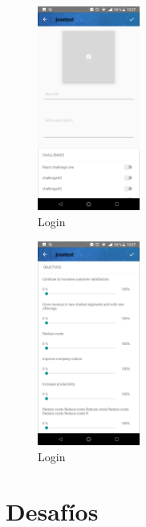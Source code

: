 \begin{figure}[!h]
	\begin{center}
		\includegraphics[width=0.3\textwidth]{./img/anexo1/crear_idea.png}
		\caption{Login}
		\label{fig:crear_idea}
	\end{center}
\end{figure}

\begin{figure}[!h]
	\begin{center}
		\includegraphics[width=0.3\textwidth]{./img/anexo1/crear_idea_cont.png}
		\caption{Login}
		\label{fig:crear_idea_cont}
	\end{center}
\end{figure}

\section{Desafíos}


